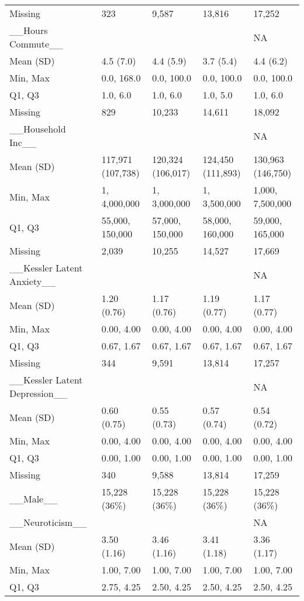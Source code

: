 \documentclass[
  single column]{article}
\begin{document}
\begin{longtable}[t]{lllll}
Missing & 323 & 9,587 & 13,816 & 17,252\\
\_\_Hours Commute\_\_ &   ~~&   ~~&   ~~& NA\\
\addlinespace
Mean (SD) & 4.5 (7.0) & 4.4 (5.9) & 3.7 (5.4) & 4.4 (6.2)\\
Min, Max & 0.0, 168.0 & 0.0, 100.0 & 0.0, 100.0 & 0.0, 100.0\\
Q1, Q3 & 1.0, 6.0 & 1.0, 6.0 & 1.0, 5.0 & 1.0, 6.0\\
Missing & 829 & 10,233 & 14,611 & 18,092\\
\_\_Household Inc\_\_ &   ~~&   ~~&   ~~& NA\\
\addlinespace
Mean (SD) & 117,971 (107,738) & 120,324 (106,017) & 124,450 (111,893) & 130,963 (146,750)\\
Min, Max & 1, 4,000,000 & 1, 3,000,000 & 1, 3,500,000 & 1,000, 7,500,000\\
Q1, Q3 & 55,000, 150,000 & 57,000, 150,000 & 58,000, 160,000 & 59,000, 165,000\\
Missing & 2,039 & 10,255 & 14,527 & 17,669\\
\_\_Kessler Latent Anxiety\_\_ &   ~~&   ~~&   ~~& NA\\
\addlinespace
Mean (SD) & 1.20 (0.76) & 1.17 (0.76) & 1.19 (0.77) & 1.17 (0.77)\\
Min, Max & 0.00, 4.00 & 0.00, 4.00 & 0.00, 4.00 & 0.00, 4.00\\
Q1, Q3 & 0.67, 1.67 & 0.67, 1.67 & 0.67, 1.67 & 0.67, 1.67\\
Missing & 344 & 9,591 & 13,814 & 17,257\\
\_\_Kessler Latent Depression\_\_ &   ~~&   ~~&   ~~& NA\\
\addlinespace
Mean (SD) & 0.60 (0.75) & 0.55 (0.73) & 0.57 (0.74) & 0.54 (0.72)\\
Min, Max & 0.00, 4.00 & 0.00, 4.00 & 0.00, 4.00 & 0.00, 4.00\\
Q1, Q3 & 0.00, 1.00 & 0.00, 1.00 & 0.00, 1.00 & 0.00, 1.00\\
Missing & 340 & 9,588 & 13,814 & 17,259\\
\_\_Male\_\_ & 15,228 (36\%) & 15,228 (36\%) & 15,228 (36\%) & 15,228 (36\%)\\
\addlinespace
\_\_Neuroticism\_\_ &   ~~&   ~~&   ~~& NA\\
Mean (SD) & 3.50 (1.16) & 3.46 (1.16) & 3.41 (1.18) & 3.36 (1.17)\\
Min, Max & 1.00, 7.00 & 1.00, 7.00 & 1.00, 7.00 & 1.00, 7.00\\
Q1, Q3 & 2.75, 4.25 & 2.50, 4.25 & 2.50, 4.25 & 2.50, 4.25\\

\end{longtable}
\end{document}
